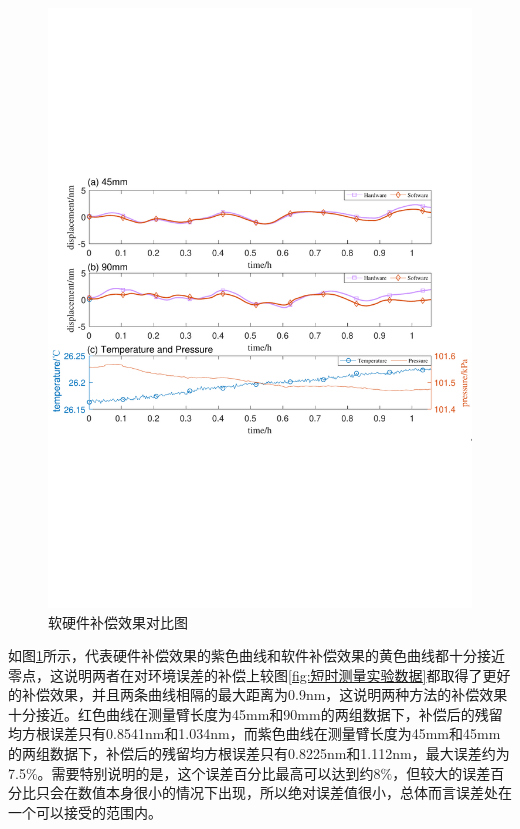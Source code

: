 \begin{figure}[htb]
  \centering
  \includegraphics[width=14cm]{fig/6-fig/软硬件补偿效果对比.pdf}
  \caption{软硬件补偿效果对比图}
  \label{fig:软硬件补偿效果对比图}
\end{figure}
如图\ref{fig:软硬件补偿效果对比图}所示，代表硬件补偿效果的紫色曲线和软件补偿效果的黄色曲线都十分接近零点，这说明两者在对环境误差的补偿上较图\ref{fig:短时测量实验数据}都取得了更好的补偿效果，并且两条曲线相隔的最大距离为0.9nm，这说明两种方法的补偿效果十分接近。红色曲线在测量臂长度为45mm和90mm的两组数据下，补偿后的残留均方根误差只有0.8541nm和1.034nm，而紫色曲线在测量臂长度为45mm和45mm的两组数据下，补偿后的残留均方根误差只有0.8225nm和1.112nm，最大误差约为7.5$\%$。需要特别说明的是，这个误差百分比最高可以达到约8$\%$，但较大的误差百分比只会在数值本身很小的情况下出现，所以绝对误差值很小，总体而言误差处在一个可以接受的范围内。

